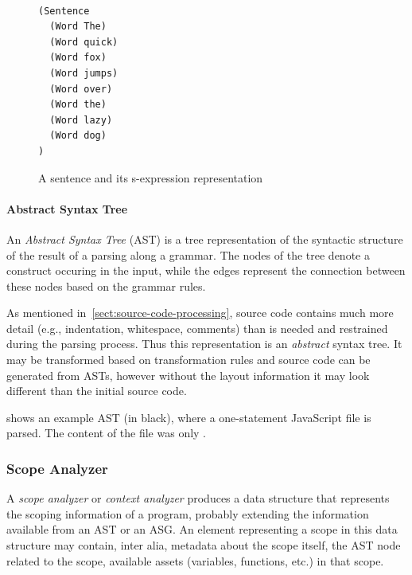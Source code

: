 \begin{figure}[!htb]
\centering
{}\\[1em]

\begin{minipage}{3cm}
\begin{verbatim}
(Sentence
  (Word The)
  (Word quick)
  (Word fox)
  (Word jumps)
  (Word over)
  (Word the)
  (Word lazy)
  (Word dog)
)
\end{verbatim}
\end{minipage}
  \caption{A sentence and its s-expression representation}
  \label{fig:sentence-s-expression}
\end{figure}

\paragraph{Abstract Syntax Tree}
An \emph{Abstract Syntax Tree} (AST) is a tree representation of the syntactic structure of the result of a parsing along a grammar. The nodes of the tree denote a construct occuring in the input, while the edges represent the connection between these nodes based on the grammar rules.

As mentioned in~\cref{sect:source-code-processing}, source code contains much more detail (e.g., indentation, whitespace, comments) than is needed and restrained during the parsing process. Thus this representation is an \emph{abstract} syntax tree. It may be transformed based on transformation rules and source code can be generated from ASTs, however without the layout information it may look different than the initial source code.

 shows an example AST (in black), where a one-statement JavaScript file is parsed. The content of the file was only .

\subsubsection{Scope Analyzer}
A \emph{scope analyzer} or \emph{context analyzer} produces a data structure that represents the scoping information of a program, probably extending the information available from an AST or an ASG. An element representing a scope in this data structure may contain, inter alia, metadata about the scope itself, the AST node related to the scope, available assets (variables, functions, etc.) in that scope.~\cite{shift-scope}

